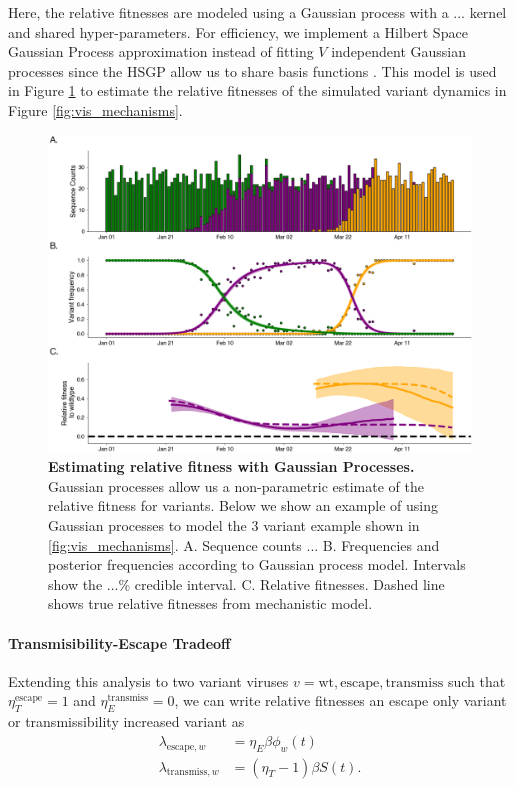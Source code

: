 \documentclass[12pt,oneside,letterpaper]{article}
\newcommand{\wt}{\text{wt}}
\newcommand{\varE}{\text{escape}}
\newcommand{\varT}{\text{transmiss}}
\begin{document}
Here, the relative fitnesses are modeled using a Gaussian process with a ... kernel and shared hyper-parameters.
For efficiency, we implement a Hilbert Space Gaussian Process approximation instead of fitting $V$ independent Gaussian processes since the HSGP allow us to share basis functions \cite{riutortmayol2022practical}.
This model is used in Figure \ref{fig:gp_example} to estimate the relative fitnesses of the simulated variant dynamics in Figure \ref{fig:vis_mechanisms}.

\begin{figure}[h]
    \centering
    \includegraphics[width=0.8\linewidth]{./figures/gp_example.png}
    \caption{\textbf{Estimating relative fitness with Gaussian Processes.} 
    Gaussian processes allow us a non-parametric estimate of the relative fitness for variants. 
    Below we show an example of using Gaussian processes to model the 3 variant example shown in \ref{fig:vis_mechanisms}.
    A. Sequence counts ...
    B. Frequencies and posterior frequencies according to Gaussian process model. Intervals show the ...\% credible interval.
    C. Relative fitnesses. Dashed line shows true relative fitnesses from mechanistic model. 
}
    \label{fig:gp_example}
\end{figure}


\paragraph{Transmisibility-Escape Tradeoff}%

Extending this analysis to two variant viruses $v= \wt, \varE, \varT$ such that $\eta_{T}^{\varE} = 1$ and $\eta_{E}^{\varT} = 0$, we can write relative fitnesses an escape only variant or transmissibility increased variant as
\begin{align*}
    \lambda_{\varE, w} &= \eta_{E} \beta \phi_{w}(t)\\
    \lambda_{\varT, w} &= (\eta_{T} - 1) \beta S(t).
\end{align*}
\end{document}
